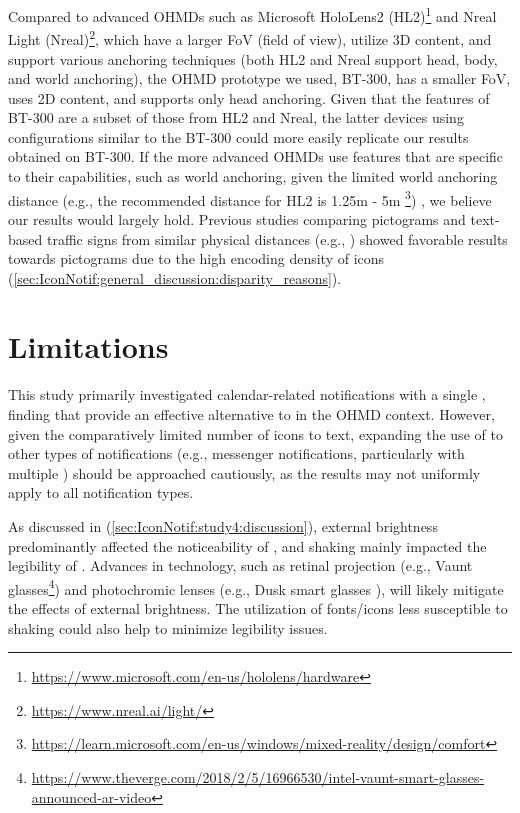 Compared to advanced OHMDs such as Microsoft HoloLens2 (HL2)\footnote{\url{https://www.microsoft.com/en-us/hololens/hardware}} and Nreal Light (Nreal)\footnote{\url{https://www.nreal.ai/light/}}, which have a larger FoV (field of view), utilize 3D content, and support various anchoring techniques (both HL2 and Nreal support head, body, and world anchoring), the OHMD prototype we used, BT-300, has a smaller FoV, uses 2D content, and supports only head anchoring. Given that the features of BT-300 are a subset of those from HL2 and Nreal, the latter devices using configurations similar to the BT-300 could more easily replicate our results obtained on BT-300. If the more advanced OHMDs use features that are specific to their capabilities, such as world anchoring, given the limited world anchoring distance (e.g., the recommended distance for HL2 is 1.25m - 5m \footnote{\url{https://learn.microsoft.com/en-us/windows/mixed-reality/design/comfort}}) \cite{itoh_towards_2021}, we believe our results would largely hold. Previous studies comparing pictograms and text-based traffic signs from similar physical distances (e.g., \cite{ells_rapid_1979}) showed favorable results towards pictograms due to the high encoding density of icons (\autoref{sec:IconNotif:general_discussion:disparity_reasons}).
















\section{Limitations}
\label{sec:IconNotif:limitations}

This study primarily investigated calendar-related notifications with a single \secondaryinfo{}, finding that  provide an effective alternative to  in the OHMD context. However, given the comparatively limited number of icons to text, expanding the use of  to other types of notifications (e.g., messenger notifications, particularly with multiple \secondaryinfo{}) should be approached cautiously, as the results may not uniformly apply to all notification types.
 
As discussed in \studyfour{} (\autoref{sec:IconNotif:study4:discussion}), external brightness predominantly affected the noticeability of , and shaking mainly impacted the legibility of . Advances in technology, such as retinal projection \cite{itoh_towards_2021} (e.g., Vaunt glasses\footnote{\url{https://www.theverge.com/2018/2/5/16966530/intel-vaunt-smart-glasses-announced-ar-video}}) and photochromic lenses (e.g., Dusk smart glasses \cite{ampere_dusk_2023}), will likely mitigate the effects of external brightness. The utilization of fonts/icons less susceptible to shaking \cite{matsuura_readability_2019} could also help to minimize legibility issues. 

